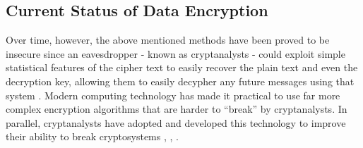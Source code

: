 \documentclass[journal]{IEEEtran}
\begin{document}
\subsection{\textbf{Current Status of Data Encryption}}
Over time, however, the above mentioned methods have been proved to be insecure since an eavesdropper - known as cryptanalysts - could exploit simple statistical features of the cipher text to easily recover the plain text and even the decryption key, allowing them to easily decypher any future messages using that system \cite{encryption_today}. Modern computing technology has made it practical to use far more complex encryption algorithms that are harder to “break” by cryptanalysts. In parallel, cryptanalysts have adopted and developed this technology to improve their ability to break cryptosystems \cite{des_cryptanalysis}, \cite{rijndael_cryptanalysis}, \cite{rsa_cryptanalysis}. 
\end{document}
